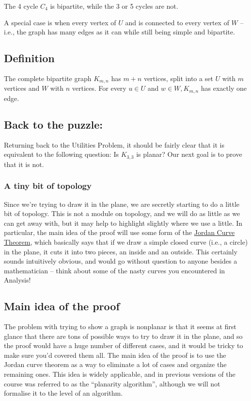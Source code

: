 \documentclass[]{article}
\begin{document}
The 4 cycle \(C_4\) is bipartite, while the 3 or 5 cycles are not.

A special case is when every vertex of \(U\) and is connected to every
vertex of \(W\) -- i.e., the graph has many edges as it can while still
being simple and bipartite.

\subsection{Definition}\label{definition-12}

The complete bipartite graph \(K_{m,n}\) has \(m+n\) vertices, split
into a set \(U\) with \(m\) vertices and \(W\) with \(n\) vertices. For
every \(u\in U\) and \(w\in W, K_{m,n}\) has exactly one edge.

\subsection{Back to the puzzle:}\label{back-to-the-puzzle}

Returning back to the Utilities Problem, it should be fairly clear that
it is equivalent to the following question: Is \(K_{3,3}\) is planar?
Our next goal is to prove that it is not.

\subsubsection{A tiny bit of topology}\label{a-tiny-bit-of-topology}

Since we're trying to draw it in the plane, we are secretly starting to
do a little bit of topology. This is not a module on topology, and we
will do as little as we can get away with, but it may help to highlight
slightly where we use a little. In particular, the main idea of the
proof will use some form of the
\href{https://en.wikipedia.org/wiki/Jordan_curve_theorem}{Jordan Curve
Theorem}, which basically says that if we draw a simple closed curve
(i.e., a circle) in the plane, it cuts it into two pieces, an inside and
an outside. This certainly sounds intuitively obvious, and would go
without question to anyone besides a mathematician -- think about some
of the nasty curves you encountered in Analysis!

\subsection{Main idea of the proof}\label{main-idea-of-the-proof}

The problem with trying to show a graph is nonplanar is that it seems at
first glance that there are tons of possible ways to try to draw it in
the plane, and so the proof would have a huge number of different cases,
and it would be tricky to make sure you'd covered them all. The main
idea of the proof is to use the Jordan curve theorem as a way to
eliminate a lot of cases and organize the remaining ones. This idea is
widely applicable, and in previous versions of the course was referred
to as the ``planarity algorithm'', although we will not formalise it to
the level of an algorithm.
\end{document}

